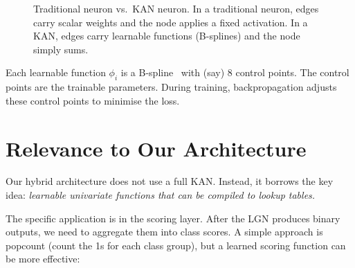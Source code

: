 \begin{figure}[htbp]
\centering
{}
\caption{Traditional neuron vs.\ KAN neuron. In a traditional neuron,
  edges carry scalar weights and the node applies a fixed activation.
  In a KAN, edges carry learnable functions (B-splines) and the node
  simply sums.}
\label{fig:kan-vs-trad}
\end{figure}

Each learnable function $\phi_i$ is a B-spline~\cite{deboor1978splines} with (say) 8 control
points. The control points are the trainable parameters. During
training, backpropagation adjusts these control points to minimise
the loss.


\section{Relevance to Our Architecture}
\label{sec:relevance}

Our hybrid architecture does not use a full KAN. Instead, it borrows
the key idea: \emph{learnable univariate functions that can be
compiled to lookup tables.}

The specific application is in the scoring layer. After the LGN
produces binary outputs, we need to aggregate them into class scores.
A simple approach is popcount (count the 1s for each class group),
but a learned scoring function can be more effective:

